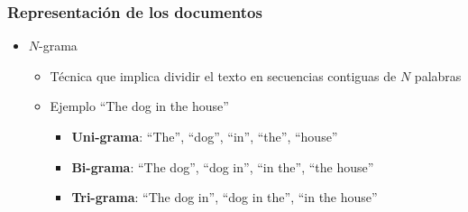\documentclass[
10pt, %
aspectratio=169, %
]{beamer}
\begin{document}
	
	\begin{frame}
		
		\frametitle{Representación de los documentos}
		
		\begin{itemize}
			\item $N$-grama
			
			\begin{itemize}
				\item Técnica que implica dividir el texto en secuencias contiguas de $N$ palabras
				
				\pause
				\item Ejemplo ``The dog in the house''
				\begin{itemize}
					\item \textbf{Uni-grama}: ``The'', ``dog'', ``in'', ``the'', ``house''
					\item \textbf{Bi-grama}: ``The dog'', ``dog in'', ``in the'', ``the house''
					\item \textbf{Tri-grama}: ``The dog in'', ``dog in the'', ``in the house''
				\end{itemize}
				
			\end{itemize}
			
		\end{itemize}
		
		
	\end{frame}
	
	
\end{document}
